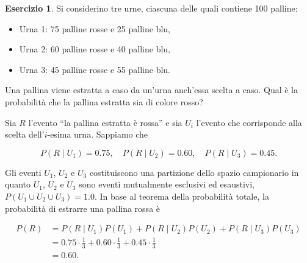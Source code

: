 \documentclass[
  11pt,
]{krantz}
\providecommand{\tightlist}{%
  \setlength{\itemsep}{0pt}\setlength{\parskip}{0pt}}
\theoremstyle{definition}
\theoremstyle{definition}
\theoremstyle{definition}
\newtheorem{exercise}{Esercizio}[chapter]
\theoremstyle{definition}
\theoremstyle{remark}
\begin{document}
\begin{exercise}
Si considerino tre urne, ciascuna delle quali contiene 100 palline:

\begin{itemize}
\tightlist
\item
  Urna 1: 75 palline rosse e 25 palline blu,
\item
  Urna 2: 60 palline rosse e 40 palline blu,
\item
  Urna 3: 45 palline rosse e 55 palline blu.
\end{itemize}

\noindent Una pallina viene estratta a caso da un'urna anch'essa scelta a caso. Qual è la probabilità che la pallina estratta sia di colore rosso?

Sia \(R\) l'evento ``la pallina estratta è rossa'' e sia \(U_i\) l'evento che corrisponde alla scelta dell'\(i\)-esima urna. Sappiamo che

\[
P(R \mid U_1) = 0.75, \quad P(R \mid U_2) = 0.60, \quad P(R \mid U_3) = 0.45.
\]

Gli eventi \(U_1\), \(U_2\) e \(U_3\) costituiscono una partizione dello spazio campionario in quanto \(U_1\), \(U_2\) e \(U_3\) sono eventi mutualmente esclusivi ed esaustivi, \(P(U_1 \cup U_2 \cup U_3) = 1.0\). In base al teorema della probabilità totale, la probabilità di estrarre una pallina rossa è

\[
\begin{split}
P(R) &= P(R \mid U_1)P(U_1)+P(R \mid U_2)P(U_2)+P(R \mid U_3)P(U_3) \\
&= 0.75 \cdot \frac{1}{3}+0.60 \cdot \frac{1}{3}+0.45 \cdot \frac{1}{3} \\
&=0.60.
\end{split}
\]
\end{exercise}
\end{document}
